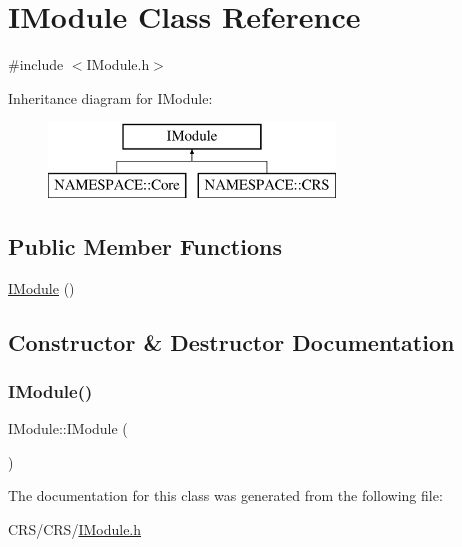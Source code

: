 \hypertarget{class_i_module}{}\section{I\+Module Class Reference}
\label{class_i_module}


{\ttfamily \#include $<$I\+Module.\+h$>$}

Inheritance diagram for I\+Module\+:\begin{figure}[H]
\begin{center}
\leavevmode
\includegraphics[height=2.000000cm]{class_i_module}
\end{center}
\end{figure}
\subsection*{Public Member Functions}
\begin{DoxyCompactItemize}
\item 
\hyperlink{class_i_module_ae926f787722b9aecd589be6c7aba1f66}{I\+Module} ()
\end{DoxyCompactItemize}


\subsection{Constructor \& Destructor Documentation}
\mbox{\label{class_i_module_ae926f787722b9aecd589be6c7aba1f66}} 
\subsubsection{\texorpdfstring{I\+Module()}{IModule()}}
{\footnotesize\ttfamily I\+Module\+::\+I\+Module (\begin{DoxyParamCaption}{ }\end{DoxyParamCaption})\hspace{0.3cm}{\ttfamily [inline]}}



The documentation for this class was generated from the following file\+:\begin{DoxyCompactItemize}
\item 
C\+R\+S/\+C\+R\+S/\hyperlink{_i_module_8h}{I\+Module.\+h}\end{DoxyCompactItemize}
